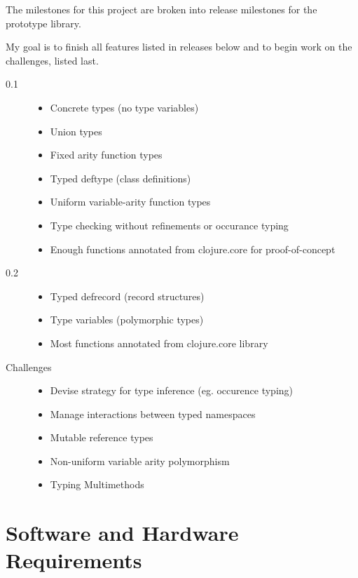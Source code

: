 \documentclass[12pt, a4paper]{article}
\begin{document}
The milestones for this project are broken into release milestones
for the prototype library.

My goal is to finish all features listed in releases below
and to begin work on the challenges, listed last.

\begin{description}
\item[0.1]
	\begin{itemize}
	\item Concrete types (no type variables)
	\item Union types
	\item Fixed arity function types
	\item Typed deftype (class definitions)
	\item Uniform variable-arity function types
	\item Type checking without refinements or occurance typing
	\item Enough functions annotated from clojure.core for proof-of-concept
	\end{itemize}
\item[0.2]
	\begin{itemize}
	\item Typed defrecord (record structures)
	\item Type variables (polymorphic types)
	\item Most functions annotated from clojure.core library
	\end{itemize}
\item[Challenges]
	\begin{itemize}
	\item Devise strategy for type inference (eg. occurence typing)
	\item Manage interactions between typed namespaces
	\item Mutable reference types
	\item Non-uniform variable arity polymorphism
	\item Typing Multimethods
	\end{itemize}

\end{description}
\section*{Software and Hardware Requirements}
\end{document}
